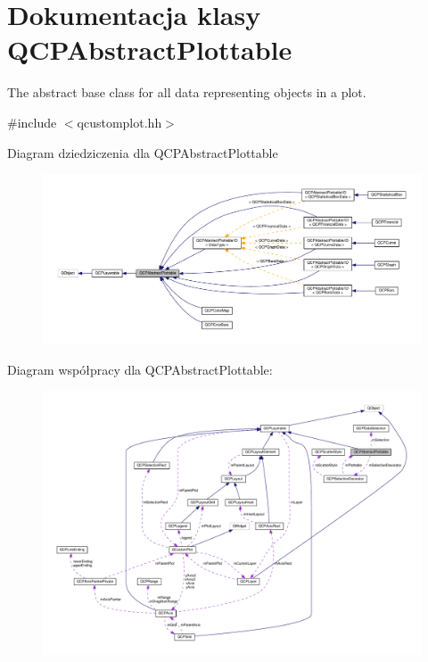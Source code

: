 \hypertarget{class_q_c_p_abstract_plottable}{}\section{Dokumentacja klasy Q\+C\+P\+Abstract\+Plottable}
\label{class_q_c_p_abstract_plottable}


The abstract base class for all data representing objects in a plot.  




{\ttfamily \#include $<$qcustomplot.\+hh$>$}



Diagram dziedziczenia dla Q\+C\+P\+Abstract\+Plottable\nopagebreak
\begin{figure}[H]
\begin{center}
\leavevmode
\includegraphics[width=350pt]{class_q_c_p_abstract_plottable__inherit__graph}
\end{center}
\end{figure}


Diagram współpracy dla Q\+C\+P\+Abstract\+Plottable\+:\nopagebreak
\begin{figure}[H]
\begin{center}
\leavevmode
\includegraphics[width=350pt]{class_q_c_p_abstract_plottable__coll__graph}
\end{center}
\end{figure}
